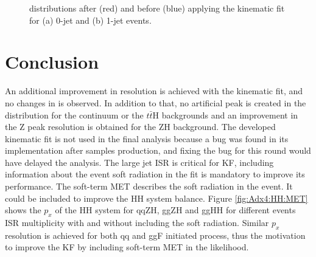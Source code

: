 \begin{figure}[htbp]
   \centering
   \begin{tcolorbox}[colback=black!5!white,colframe=white!75!black]
   \caption{\myy distributions after (red) and before (blue) applying the kinematic fit for (a) 0-jet and (b) 1-jet events.}
   \label{fig:Adx4:HH:myy}
   \end{tcolorbox}
   
\end{figure}


\section{Conclusion}

An additional improvement in \mbb resolution is achieved with the kinematic fit, and no changes in \myy is observed. In addition to that, no artificial peak is created in the \mbb distribution for the continuum or the $t\bar{t}$H backgrounds and an improvement in the Z peak resolution is obtained for the ZH background. The developed kinematic fit is not used in the final analysis because a bug was found in its implementation after samples production, and fixing the bug for this round would have delayed the analysis. The large jet ISR is critical for \HHyybb KF, including information about the event soft radiation in the fit is mandatory to improve its performance. The soft-term MET describes the soft radiation in the event. It could be included to improve the HH system balance. Figure \ref{fig:Adx4:HH:MET} shows the $p_x$ of the HH system for qqZH, ggZH and ggHH for different events ISR multiplicity with and without including the soft radiation. Similar $p_x$ resolution is achieved for both qq and ggF initiated process, thus the motivation to improve the KF by including soft-term MET in the likelihood. 

